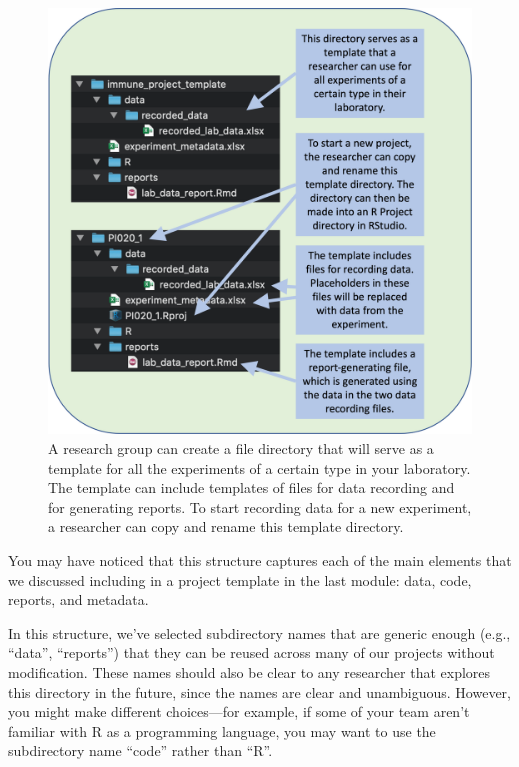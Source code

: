 \documentclass[]{tufte-book}
\begin{document}
\begin{figure}
\includegraphics[width=\textwidth]{figures/project_template_directory} \caption[A research group can create a file directory that will serve as a template for all the experiments of a certain type in your laboratory]{A research group can create a file directory that will serve as a template for all the experiments of a certain type in your laboratory. The template can include templates of files for data recording and for generating reports. To start recording data for a new experiment, a researcher can copy and rename this template directory.}\label{fig:templatedirectorymod8}
\end{figure}

You may have noticed that this structure captures each of the main elements
that we discussed including in a project template in the last module:
data, code, reports, and metadata.

In this structure, we've selected subdirectory names that are generic enough
(e.g., ``data'', ``reports'') that they can be reused across many of our projects
without modification. These names should also be clear to any researcher that
explores this directory in the future, since the names are clear and
unambiguous. However, you might make different choices---for example, if
some of your team aren't familiar with R as a programming language, you may
want to use the subdirectory name ``code'' rather than ``R''.
\end{document}
